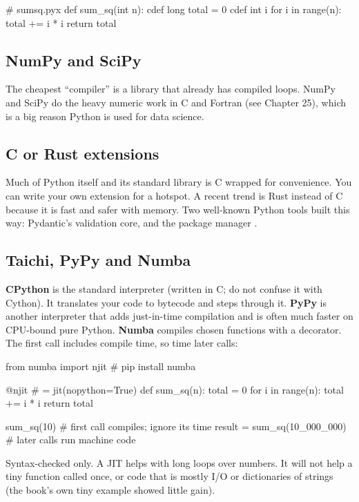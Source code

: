 \begin{rawcode}
# sumsq.pyx
def sum_sq(int n):
    cdef long total = 0
    cdef int i
    for i in range(n):
        total += i * i
    return total
\end{rawcode}

\subsection{NumPy and SciPy}

The cheapest ``compiler'' is a library that already has compiled loops. NumPy and SciPy do the heavy
numeric work in C and Fortran (see Chapter 25), which is a big reason Python is used for data
science.

\subsection{C or Rust extensions}

Much of Python itself and its standard library is C wrapped for convenience. You can write your own
extension for a hotspot. A recent trend is Rust instead of C because it is fast and safer with
memory. Two well-known Python tools built this way: Pydantic's validation core, and the package
manager .

\subsection{Taichi, PyPy and Numba}

\textbf{CPython} is the standard interpreter (written in C; do not confuse it with Cython). It
translates your code to bytecode and steps through it. \textbf{PyPy} is another interpreter that
adds just-in-time compilation and is often much faster on CPU-bound pure Python. \textbf{Numba}
compiles chosen functions with a decorator. The first call includes compile time, so time later
calls:

\begin{pycode}
from numba import njit          # pip install numba

@njit                           # = jit(nopython=True)
def sum_sq(n):
    total = 0
    for i in range(n):
        total += i * i
    return total

sum_sq(10)                      # first call compiles; ignore its time
result = sum_sq(10_000_000)     # later calls run machine code
\end{pycode}

Syntax-checked only. A JIT helps with long loops over numbers. It will not help a tiny function
called once, or code that is mostly I/O or dictionaries of strings (the book's own tiny
 example showed little gain).

